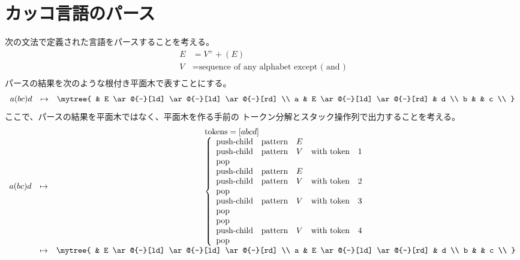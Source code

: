 \section{カッコ言語のパース}\label{s1:カッコ言語のパース} %
	次の文法で定義された言語をパースすることを考える。
	\begin{equation*}\begin{split} %
		E &= V^+ + (E) \\
		V &= \text{sequence of any alphabet except ( and )} \\
	\end{split}\end{equation*} %
	パースの結果を次のような根付き平面木で表すことにする。
	\begin{equation*}\begin{array}{ccc} %
		a (b c) d &\mapsto& \mytree {
			& E \ar@{-}[ld] \ar@{-}[ld] \ar@{-}[rd] \\
			a & E \ar@{-}[ld] \ar@{-}[rd] & d \\
			b & & c \\
		}
	\end{array}\end{equation*} %
	ここで、パースの結果を平面木ではなく、平面木を作る手前の
	トークン分解とスタック操作列で出力することを考える。
	\begin{equation*}\begin{array}{ccccc} %
		a (b c) d &\mapsto&  \begin{array}{l}
			\text{tokens} = \word{abcd} \\
			\left\{\begin{array}{lllll}
				\text{push-child} &\text{pattern}& E \\
				\text{push-child}  &\text{pattern}& V &\text{with token}& 1 \\
				\text{pop} \\
				\text{push-child} &\text{pattern}& E \\
				\text{push-child}  &\text{pattern}& V &\text{with token}& 2 \\
				\text{pop} \\
				\text{push-child}  &\text{pattern}& V &\text{with token}& 3 \\
				\text{pop} \\
				\text{pop} \\
				\text{push-child}  &\text{pattern}& V &\text{with token}& 4 \\
				\text{pop} \\
			\end{array}\right.%
		\end{array} \\
		&\mapsto& \mytree {
			& E \ar@{-}[ld] \ar@{-}[ld] \ar@{-}[rd] \\
			a & E \ar@{-}[ld] \ar@{-}[rd] & d \\
			b & & c \\
		}
	\end{array}\end{equation*} %
